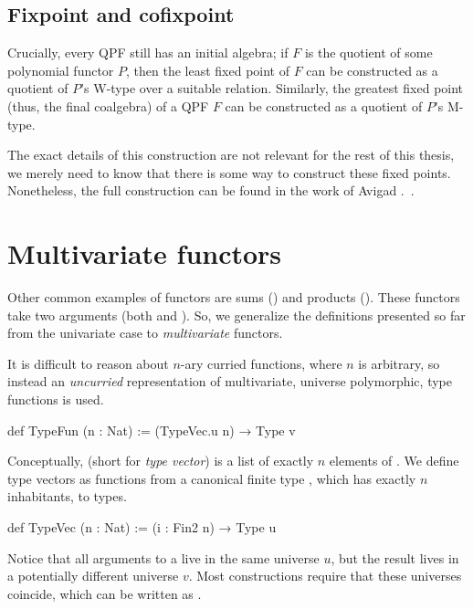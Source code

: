 \subsection*{Fixpoint and cofixpoint}
Crucially, every QPF still has an initial algebra; if $F$ is the quotient of some polynomial functor
$P$, then the least fixed point of $F$ can be constructed as a quotient of $P$'s W-type over a suitable
relation.
Similarly, the greatest fixed point (thus, the final coalgebra) of a QPF $F$ can be constructed as
a quotient of $P$'s M-type.

The exact details of this construction are not relevant for the rest of this thesis, we merely need to know that there is some way to construct these fixed points. Nonetheless, the full construction can be found in the work of Avigad \etal{}.~\cite{avigadDataTypesQuotients2019a}.







\section{Multivariate functors}%
\label{sec:mvfunctor}

Other common examples of functors are sums () and products ().
These functors take two arguments (both  and ).
So, we generalize the definitions presented so far from the univariate case to \emph{multivariate} functors.

It is difficult to reason about $n$-ary curried functions, where $n$ is arbitrary, so instead an \emph{uncurried} representation of multivariate, universe polymorphic, type functions is used.

\begin{leancode}
    def TypeFun (n : Nat) := (TypeVec.{u} n) → Type v
\end{leancode}
Conceptually,  (short for \emph{type vector}) is a list of exactly $n$ elements of .
We define type vectors as functions from a canonical finite type , which has exactly $n$ inhabitants,
to types.
\begin{leancode}
    def TypeVec (n : Nat) := (i : Fin2 n) → Type u
\end{leancode}
Notice that all arguments to a  live in the same universe $u$, but the result lives in a potentially different universe $v$. 
Most constructions require that these universes coincide, which can be written as .

